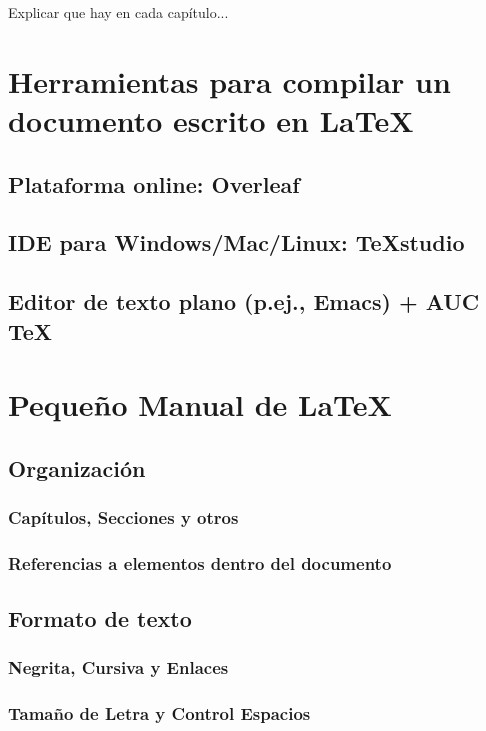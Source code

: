 \documentclass[twoside]{tfg-urjc}
\begin{document}
Explicar que hay en cada capítulo...


\chapter{Herramientas para compilar un documento escrito en \LaTeX}
\label{cap:tools}

\section{Plataforma online: Overleaf}

\section{IDE para Windows/Mac/Linux: TeXstudio}

\section{Editor de texto plano (p.ej., Emacs) + AUC \TeX}



\chapter{Pequeño Manual de \LaTeX}

\section{Organización}

\subsection{Capítulos, Secciones y otros}

\subsection{Referencias a elementos dentro del documento}

\section{Formato de texto}

\subsection{Negrita, Cursiva y Enlaces}

\subsection{Tamaño de Letra y Control Espacios}
\end{document}
